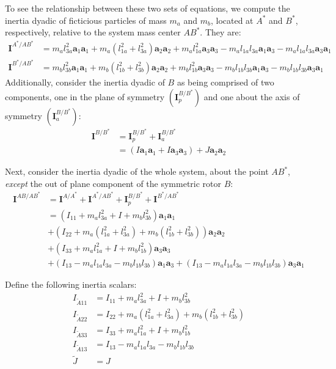 \documentclass[letterpaper,11pt]{article}
\newcommand{\bs}[1]{ \boldsymbol{ #1 } }
\begin{document}
To see the relationship between these two sets of equations, we compute the
inertia dyadic of ficticious particles of mass $m_a$ and $m_b$, located at
$A^*$ and $B^*$, respectively, relative to the system mass center $AB^*$.  They
are:
\begin{align*}
  \bs{I}^{A^* / AB^*} & =
  m_al_{3a}^2\bs{a}_1\bs{a}_1 + m_a(l_{1a}^2 + l_{3a}^2)\bs{a}_2 \bs{a}_2 +
  m_al_{1a}^2\bs{a}_3\bs{a}_3 -
  m_al_{1a}l_{3a}\bs{a}_1\bs{a}_3 - m_al_{1a}l_{3a}\bs{a}_3\bs{a}_1 \\
  \bs{I}^{B^* / AB^*} & =
  m_bl_{3b}^2\bs{a}_1\bs{a}_1 + m_b(l_{1b}^2 + l_{3b}^2)\bs{a}_2 \bs{a}_2 +
  m_bl_{1b}^2\bs{a}_3\bs{a}_3 -
  m_bl_{1b}l_{3b}\bs{a}_1\bs{a}_3 - m_bl_{1b}l_{3b}\bs{a}_3\bs{a}_1
\end{align*}
Additionally, consider the inertia dyadic of $B$ as being comprised of two
components, one in the plane of symmetry $(\bs{I}^{B/B^*}_p)$ and one about
the axis of symmetry $(\bs{I}^{B/B^*}_a)$:
\begin{align*}
  \bs{I}^{B/B^*} & = \bs{I}^{B/B^*}_p + \bs{I}^{B/B^*}_a \\
  & = (I\bs{a}_1\bs{a}_1 + I\bs{a}_3\bs{a}_3) + J\bs{a}_2\bs{a}_2
\end{align*}

Next, consider the inertia dyadic of the whole system, about the point $AB^*$,
{\it{except}} the out of plane component of the symmetric rotor $B$:
\begin{align*}
  \bs{I}^{AB/AB^*} & = \bs{I}^{A/A^*} + \bs{I}^{A^*/AB^*} + \bs{I}^{B/B^*}_p +
  \bs{I}^{B^*/AB^*} \\
  & = (I_{11} + m_a l_{3a}^2 + I + m_b l_{3b}^2) \bs{a}_1\bs{a}_1 \\
  &
  +
  (I_{22} + m_a(l_{1a}^2 + l_{3a}^2) + m_b(l_{1b}^2 + l_{3b}^2))\bs{a}_2\bs{a}_2
  \\
  &
  + (I_{33} + m_al_{1a}^2 + I + m_b l_{1b}^2) \bs{a}_3\bs{a}_3
  \\
  &
  +
  (I_{13} - m_a l_{1a}l_{3a} - m_b l_{1b}l_{3b}) \bs{a}_1\bs{a}_3
  +
  (I_{13} - m_a l_{1a}l_{3a} - m_b l_{1b}l_{3b}) \bs{a}_3\bs{a}_1
\end{align*}

Define the following inertia scalars:
\begin{align*}
  I_{\tilde{A}11} & = I_{11} + m_a l_{3a}^2 + I + m_b l_{3b}^2 \\
  I_{\tilde{A}22} & = I_{22} + m_a(l_{1a}^2 + l_{3a}^2) + m_b(l_{1b}^2 +
  l_{3b}^2) \\
  I_{\tilde{A}33} & = I_{33} + m_al_{1a}^2 + I + m_b l_{1b}^2 \\
  I_{\tilde{A}13} & = I_{13} - m_a l_{1a}l_{3a} - m_b l_{1b}l_{3b} \\
  \tilde{J} & = J
\end{align*}
\end{document}
